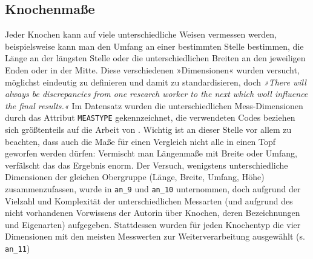 \subsection{Knochenmaße}

Jeder Knochen kann auf viele unterschiedliche Weisen vermessen werden, beispielsweise kann man den Umfang an einer bestimmten Stelle bestimmen, die Länge an der längsten Stelle oder die unterschiedlichen Breiten an den jeweiligen Enden oder in der Mitte. 
Diese verschiedenen »Dimensionen« wurden versucht, möglichst eindeutig zu definieren und damit zu standardisieren, doch \textit{»There will always be discrepancies from one research worker to the next which woll influence the final results.«} \cite{Driesch1976}
Im Datensatz wurden die unterschiedlichen Mess-Dimensionen durch das Attribut \texttt{MEASTYPE} gekennzeichnet, die verwendeten Codes beziehen sich größtenteils auf die Arbeit von \cite{Driesch1976}.
Wichtig ist an dieser Stelle vor allem zu beachten, dass auch die Maße für einen Vergleich nicht alle in einen Topf geworfen werden dürfen: Vermischt man Längenmaße mit Breite oder Umfang, verfälscht das das Ergebnis enorm.
Der Versuch, wenigstens unterschiedliche Dimensionen der gleichen Obergruppe (Länge, Breite, Umfang, Höhe) zusammenzufassen, wurde in \texttt{an\_9} und \texttt{an\_10} unternommen, doch aufgrund der Vielzahl und Komplexität der unterschiedlichen Messarten (und aufgrund des nicht vorhandenen Vorwissens der Autorin über Knochen, deren Bezeichnungen und Eigenarten) aufgegeben. 
Stattdessen wurden für jeden Knochentyp die vier Dimensionen mit den meisten Messwerten zur Weiterverarbeitung ausgewählt (s. \texttt{an\_11})